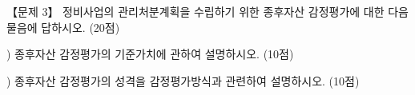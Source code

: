 \begin{longquestion}{【문제 3】}
정비사업의 관리처분계획을 수립하기 위한 종후자산 감정평가에 대한 다음 물음에 답하시오. (20점) \par
\medskip{}) 종후자산 감정평가의 기준가치에 관하여 설명하시오. (10점) \par
\medskip{}) 종후자산 감정평가의 성격을 감정평가방식과 관련하여 설명하시오. (10점) \par
\end{longquestion}
